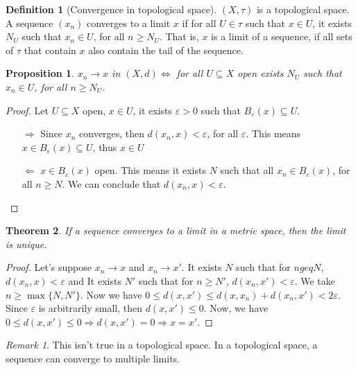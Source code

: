\documentclass{article}
\newcommand{\Al}{\Leftarrow}
\newcommand{\Ar}{\Rightarrow}
\theoremstyle{definition}
\newtheorem{definition}{Definition}[section]
\theoremstyle{definition}
\theoremstyle{plain}
\newtheorem{theorem}{Theorem}[section]
\theoremstyle{plain}
\theoremstyle{plain}
\theoremstyle{plain}
\newtheorem{proposition}[theorem]{Proposition}
\theoremstyle{definition}
\theoremstyle{remark}
\theoremstyle{remark}
\theoremstyle{remark}
\theoremstyle{remark}
\newtheorem*{remark}{Remark}
\newcommand{\E}{\varepsilon}
\begin{document}
\begin{definition}[Convergence in topological space]
  $(X, \tau)$ is a topological space. A sequence $(x_n)$ converges to a limit $x$ if for all $U \in \tau$ such that $x \in U$, it exists $N_U$ such that $x_n \in U$, for all $n \geq N_U$. That is, $x$ is a limit of a sequence, if all sets of $\tau$ that contain $x$ also contain the tail of the sequence.
\end{definition}



\begin{proposition}
  $x_n \to x$ in $(X, d) \iff$ for all $U \subseteq X$ open exists $N_U$ such that $x_n \in U$, for all $n \geq N_U$.
\end{proposition}

\begin{proof}
  Let $U \subseteq X$ open, $x \in U$, it exists $\E > 0$ such that $B_\E(x) \subseteq U$.
  \begin{itemize}
  \item[$\Ar$] Since $x_n$ converges, then $d(x_n,x) < \E$, for all $\E$. This means $x \in B_\E(x) \subseteq U$, thus $x \in U$
  \item[$\Al$] $x \in B_\E(x)$ open. This means it exists $N$ such that all $x_n \in B_\E(x)$, for all $n \geq N$. We can conclude that $d(x_n,x) < \E$.
  \end{itemize}
\end{proof}


\begin{theorem}
  If a sequence converges to a limit in a metric space, then the limit is unique.
\end{theorem}

\begin{proof}
  Let's suppose $x_n \to x$ and $x_n \to x'$. It exists $N$ such that for $n geq N$, $d(x_n,x) < \E$ and It exists $N'$ such that for $n \geq N'$, $d(x_n,x') < \E$. We take $n \geq \max\{ N, N' \}$. Now we have $0 \leq d(x,x') \leq d(x,x_n) + d(x_n,x') < 2\E$. Since $\E$ is arbitrarily small, then $d(x,x') \leq 0$. Now, we have $0 \leq d(x,x') \leq 0 \Ar d(x,x') = 0 \Ar x = x'$.
\end{proof}

\begin{remark}
  This isn't true in a topological space. In a topological space, a sequence can converge to multiple limits.
\end{remark}
\end{document}
